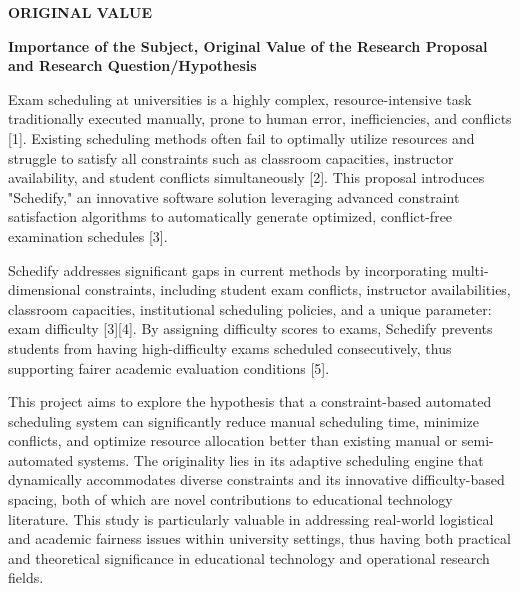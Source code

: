 \documentclass[10pt,a4paper]{article}
\newcommand{\sectionlabel}[1]{\vspace{1.2em}\noindent\textbf{\fontsize{10.5}{12}\selectfont #1}\par\vspace{0.4em}}
\newcommand{\subhead}[1]{\vspace{0.8em}\noindent\textbf{\fontsize{10}{11}\selectfont #1}\par\vspace{0.3em}}
\begin{document}
\sectionlabel{ORIGINAL VALUE}
\subhead{Importance of the Subject, Original Value of the Research Proposal and Research Question/Hypothesis}
Exam scheduling at universities is a highly complex, resource-intensive task traditionally executed manually, prone to human error, inefficiencies, and conflicts [1]. Existing scheduling methods often fail to optimally utilize resources and struggle to satisfy all constraints such as classroom capacities, instructor availability, and student conflicts simultaneously [2]. This proposal introduces "Schedify," an innovative software solution leveraging advanced constraint satisfaction algorithms to automatically generate optimized, conflict-free examination schedules [3].

Schedify addresses significant gaps in current methods by incorporating multi-dimensional constraints, including student exam conflicts, instructor availabilities, classroom capacities, institutional scheduling policies, and a unique parameter: exam difficulty [3][4]. By assigning difficulty scores to exams, Schedify prevents students from having high-difficulty exams scheduled consecutively, thus supporting fairer academic evaluation conditions [5].

This project aims to explore the hypothesis that a constraint-based automated scheduling system can significantly reduce manual scheduling time, minimize conflicts, and optimize resource allocation better than existing manual or semi-automated systems. The originality lies in its adaptive scheduling engine that dynamically accommodates diverse constraints and its innovative difficulty-based spacing, both of which are novel contributions to educational technology literature. This study is particularly valuable in addressing real-world logistical and academic fairness issues within university settings, thus having both practical and theoretical significance in educational technology and operational research fields.
\end{document}
